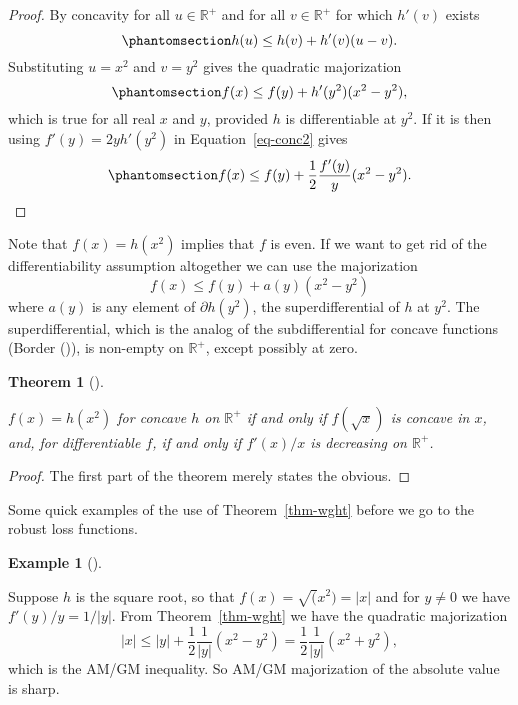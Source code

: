\documentclass[
  12pt,
  letterpaper,
  DIV=11,
  numbers=noendperiod]{scrartcl}
\theoremstyle{plain}
\theoremstyle{plain}
\newtheorem{theorem}{Theorem}[section]
\theoremstyle{plain}
\theoremstyle{definition}
\theoremstyle{definition}
\newtheorem{example}{Example}[section]
\theoremstyle{remark}
\begin{document}
\begin{proof}
By concavity for all \(u\in\mathbb{R}^+\) and for all
\(v\in\mathbb{R}^+\) for which \(h'(v)\) exists
\begin{equation}\phantomsection\label{eq-concave}{
h(u)\leq h(v)+h'(v)(u-v).
}\end{equation} Substituting \(u=x^2\) and \(v=y^2\) gives the quadratic
majorization \begin{equation}\phantomsection\label{eq-conc2}{
f(x)\leq f(y)+h'(y^2)(x^2-y^2),
}\end{equation} which is true for all real \(x\) and \(y\), provided
\(h\) is differentiable at \(y^2\). If it is then using
\(f'(y)=2yh'(y^2)\) in Equation~\ref{eq-conc2} gives
\begin{equation}\phantomsection\label{eq-concmaj}{
f(x)\leq f(y)+\frac12\frac{f'(y)}{y}(x^2-y^2).
}\end{equation}
\end{proof}

Note that \(f(x)=h(x^2)\) implies that \(f\) is even. If we want to get
rid of the differentiability assumption altogether we can use the
majorization \[
f(x)\leq f(y)+a(y)(x^2-y^2)
\] where \(a(y)\) is any element of \(\partial h(y^2)\), the
superdifferential of \(h\) at \(y^2\). The superdifferential, which is
the analog of the subdifferential for concave functions (Border
()), is non-empty on \(\mathbb{R}^+\),
except possibly at zero.

\begin{theorem}[]\protect\hypertarget{thm-sqrt}{}\label{thm-sqrt}

\(f(x)=h(x^2)\) for concave \(h\) on \(\mathbb{R}^+\) if and only if
\(f(\sqrt{x})\) is concave in \(x\), and, for differentiable \(f\), if
and only if \(f'(x)/x\) is decreasing on \(\mathbb{R}^+\).

\end{theorem}

\begin{proof}
The first part of the theorem merely states the obvious.
\end{proof}

Some quick examples of the use of Theorem~\ref{thm-wght} before we go to
the robust loss functions.

\begin{example}[]\protect\hypertarget{exm-sqrt}{}\label{exm-sqrt}

Suppose \(h\) is the square root, so that \(f(x)=\sqrt(x^2)=|x|\) and
for \(y\not=0\) we have \(f'(y)/y=1/|y|\). From Theorem~\ref{thm-wght}
we have the quadratic majorization \[
|x|\leq|y|+\frac12\frac{1}{|y|}(x^2-y^2)=\frac12\frac{1}{|y|}(x^2+y^2),
\] which is the AM/GM inequality. So AM/GM majorization of the absolute
value is sharp.

\end{example}
\end{document}
